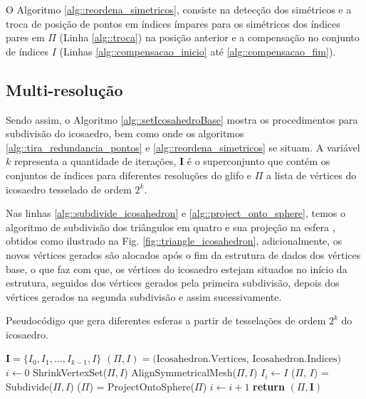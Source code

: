 O Algoritmo \ref{alg::reordena_simetricos}, consiste na detecção dos simétricos e a troca de posição de pontos em índices ímpares para os simétricos dos índices pares em $\Pi$ (Linha \ref{alg::troca}) na posição anterior e a compensação no conjunto de índices $I$ (Linhas \ref{alg::compensacao_inicio} até \ref{alg::compensacao_fim}).

\subsection{Multi-resolução}

Sendo assim, o Algoritmo \ref{alg::setIcosahedroBase} mostra os procedimentos para subdivisão do icosaedro, bem como onde os algoritmos \ref{alg::tira_redundancia_pontos} e \ref{alg::reordena_simetricos} se situam. A variável $k$ representa a quantidade de iterações, $\mathbf{I}$ é o superconjunto que contém os conjuntos de índices para diferentes resoluções do glifo e $\Pi$ a lista de vértices do icosaedro tesselado de ordem $2^k$.

Nas linhas \ref{alg::subdivide_icosahedron} e \ref{alg::project_onto_sphere}, temos o algoritmo de subdivisão dos triângulos em quatro e sua projeção na esfera \cite{luna2012}, obtidos como ilustrado na Fig. \ref{fig::triangle_icosahedron}, adicionalmente, os novos vértices gerados são alocados após o fim da estrutura de dados dos vértices base, o que faz com que, os vértices do icosaedro estejam situados no início da estrutura, seguidos dos vértices gerados pela primeira subdivisão, depois dos vértices gerados na segunda subdivisão e assim sucessivamente.

 \begin{algorithm}
 \caption{Pseudocódigo que gera diferentes esferas a partir de tesselações de ordem $2^k$ do icosaedro.}
 \label{alg::setIcosahedroBase}
 \begin{algorithmic}[1]
 \State $\mathbf{I} = \{I_0, I_1, ..., I_{k-1}, I\}$
 \State $(\Pi, I) = \text{(Icosahedron.Vertices, Icosahedron.Indices)}$  \cite{luna2012} \label{alg::init_icosahedron}
 \State $i \gets 0$
    \State ShrinkVertexSet($\Pi, I$)
    \State AlignSymmetricalMesh($\Pi, I$)
    \State $I_i \gets I$
    \State ($\Pi$, $I$) = Subdivide($\Pi, I$) \cite{luna2012}  \label{alg::subdivide_icosahedron}
    \State ($\Pi$) = ProjectOntoSphere($\Pi$) \cite{luna2012} \label{alg::project_onto_sphere}
    \State $i \gets i + 1$
\EndWhile
    \State \textbf{return} $(\Pi, \mathbf{I})$
 \EndFunction
 \end{algorithmic}
 \end{algorithm}
 

